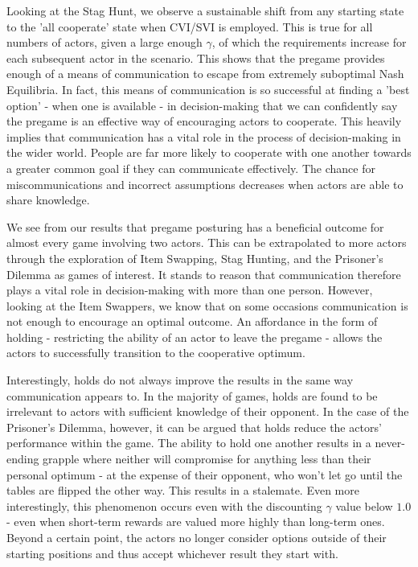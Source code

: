 Looking at the Stag Hunt, we observe a sustainable shift from any starting state to the 'all cooperate' state when CVI/SVI is employed. This is true for all numbers of actors, given a large enough $\gamma$, of which the requirements increase for each subsequent actor in the scenario. This shows that the pregame provides enough of a means of communication to escape from extremely suboptimal Nash Equilibria. In fact, this means of communication is so successful at finding a 'best option' - when one is available - in decision-making that we can confidently say the pregame is an effective way of encouraging actors to cooperate. This heavily implies that communication has a vital role in the process of decision-making in the wider world. People are far more likely to cooperate with one another towards a greater common goal if they can communicate effectively. The chance for miscommunications and incorrect assumptions decreases when actors are able to share knowledge.

We see from our results that pregame posturing has a beneficial outcome for almost every game involving two actors. This can be extrapolated to more actors through the exploration of Item Swapping, Stag Hunting, and the Prisoner's Dilemma as games of interest. It stands to reason that communication therefore plays a vital role in decision-making with more than one person. However, looking at the Item Swappers, we know that on some occasions communication is not enough to encourage an optimal outcome. An affordance in the form of holding - restricting the ability of an actor to leave the pregame - allows the actors to successfully transition to the cooperative optimum.

Interestingly, holds do not always improve the results in the same way communication appears to. In the majority of games, holds are found to be irrelevant to actors with sufficient knowledge of their opponent. In the case of the Prisoner's Dilemma, however, it can be argued that holds reduce the actors' performance within the game. The ability to hold one another results in a never-ending grapple where neither will compromise for anything less than their personal optimum - at the expense of their opponent, who won't let go until the tables are flipped the other way. This results in a stalemate. Even more interestingly, this phenomenon occurs even with the discounting $\gamma$ value below $1.0$ - even when short-term rewards are valued more highly than long-term ones. Beyond a certain point, the actors no longer consider options outside of their starting positions and thus accept whichever result they start with.

